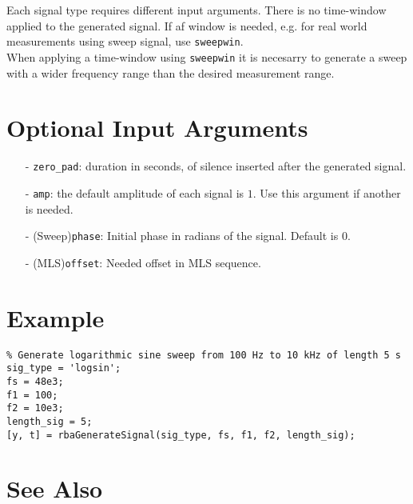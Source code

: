 Each signal type requires different input arguments. There is no time-window applied to the generated signal. If af window is needed, e.g. for real world measurements using sweep signal, use \texttt{sweepwin}.\\

When applying a time-window using \texttt{sweepwin} it is necesarry to generate a sweep with a wider frequency range than the desired measurement range.


\section{Optional Input Arguments} %
\label{sec:rbaGenerateSignal_optional_input_arguments}

\begin{itemize}
    \item[-] \texttt{zero\_pad}: duration in seconds, of silence inserted after the generated signal.
    \item[-] \texttt{amp}: the default amplitude of each signal is $1$. Use this argument if another is needed.
    \item[-] (Sweep)\texttt{phase}: Initial phase in radians of the signal. Default is $0$.
    \item[-] (MLS)\texttt{offset}: Needed offset in MLS sequence.
\end{itemize}



\section{Example} %
\label{sec:rbaGenerateSignal_example}


\begin{lstlisting}
% Generate logarithmic sine sweep from 100 Hz to 10 kHz of length 5 s
sig_type = 'logsin';
fs = 48e3;
f1 = 100;
f2 = 10e3;
length_sig = 5;
[y, t] = rbaGenerateSignal(sig_type, fs, f1, f2, length_sig);
\end{lstlisting}


\section{See Also} %
\label{sec:rbaGenerateSignal_see_also}
\texttt{}




